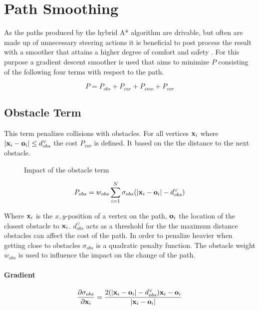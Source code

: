 \section{Path Smoothing}
As the paths produced by the hybrid A* algorithm are drivable, but often are made up of unnecessary steering actions it is beneficial to post process the result with a smoother that attains a higher degree of comfort and safety \cite{Dolgov.2008,Dolgov.2010}. For this purpose a gradient descent smoother is used that aims to minimize $P$ consisting of the following four terms with respect to the path.

\begin{equation}
P = P_{obs} + P_{cur} + P_{smo} + P_{vor}
\end{equation}

\subsection{Obstacle Term}

This term penalizes collisions with obstacles. For all vertices $\mathbf{x}_i$ where $|\mathbf{x}_i - \mathbf{o}_i| \leq d_{obs}^{\lor}$ the cost $P_{vor}$ is defined. It based on the the distance to the next obstacle.

\begin{figure}[h]
    \caption{Impact of the obstacle term}
    \label{fig:obstacleTerm}
\end{figure}

\begin{equation}
P_{obs} = w_{obs} \displaystyle\sum_{i=1}^{N} \sigma_{obs}(|\mathbf{x}_i-\mathbf{o}_i|-d_{obs}^{\lor})
\end{equation}

Where $\mathbf{x}_i$ is the $x,y$-position of a vertex on the path, $\mathbf{o}_i$ the location of the closest obstacle to $\mathbf{x}_i$. $d_{obs}^{\lor}$ acts as a threshold for the the maximum distance obstacles can affect the cost of the path. In order to penalize heavier when getting close to obstacles $\sigma_{obs}$ is a quadratic penalty function. The obstacle weight $w_{obs}$ is used to influence the impact on the change of the path.

\paragraph{Gradient}

\begin{equation}
\frac{\partial \sigma_{obs}}{\partial \mathbf{x}_i} = \frac{2(|\mathbf{x}_i-\mathbf{o}_i|-d_{obs}^{\lor})\mathbf{x}_i-\mathbf{o}_i}{|\mathbf{x}_i-\mathbf{o}_i|}
\end{equation}


